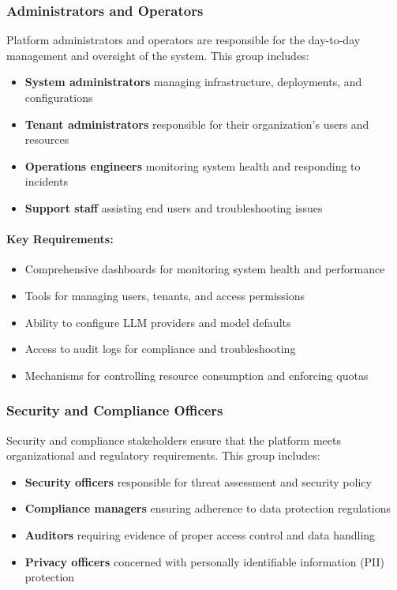 \subsubsection{Administrators and Operators}

Platform administrators and operators are responsible for the day-to-day management and oversight of the system. This group includes:

\begin{itemize}
    \item \textbf{System administrators} managing infrastructure, deployments, and configurations
    \item \textbf{Tenant administrators} responsible for their organization's users and resources
    \item \textbf{Operations engineers} monitoring system health and responding to incidents
    \item \textbf{Support staff} assisting end users and troubleshooting issues
\end{itemize}

\paragraph{Key Requirements:}
\begin{itemize}
    \item Comprehensive dashboards for monitoring system health and performance
    \item Tools for managing users, tenants, and access permissions
    \item Ability to configure LLM providers and model defaults
    \item Access to audit logs for compliance and troubleshooting
    \item Mechanisms for controlling resource consumption and enforcing quotas
\end{itemize}

\subsubsection{Security and Compliance Officers}

Security and compliance stakeholders ensure that the platform meets organizational and regulatory requirements. This group includes:

\begin{itemize}
    \item \textbf{Security officers} responsible for threat assessment and security policy
    \item \textbf{Compliance managers} ensuring adherence to data protection regulations
    \item \textbf{Auditors} requiring evidence of proper access control and data handling
    \item \textbf{Privacy officers} concerned with personally identifiable information (PII) protection
\end{itemize}

